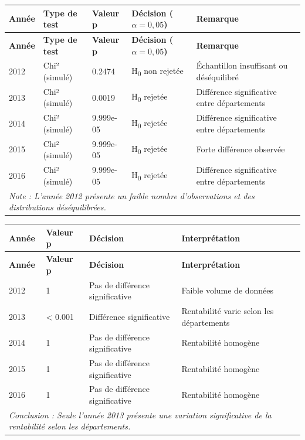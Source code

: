 \documentclass[mstat,12pt]{unswthesis}
\begin{document}
\scriptsize
\begin{longtable}{|p{1.2cm}|p{3.5cm}|p{2cm}|p{3cm}|p{4.2cm}|}
\hline
\textbf{Année} & \textbf{Type de test} & \textbf{Valeur p} & \textbf{Décision ($\alpha = 0{,}05$)} & \textbf{Remarque} \\
\hline \endfirsthead
\hline \textbf{Année} & \textbf{Type de test} & \textbf{Valeur p} & \textbf{Décision ($\alpha = 0{,}05$)} & \textbf{Remarque} \\ \hline \endhead
2012 & Chi² (simulé) & 0.2474 & H\textsubscript{0} non rejetée & Échantillon insuffisant ou déséquilibré \\
2013 & Chi² (simulé) & 0.0019 & H\textsubscript{0} rejetée & Différence significative entre départements \\
2014 & Chi² (simulé) & 9.999e-05 & H\textsubscript{0} rejetée & Différence significative entre départements \\
2015 & Chi² (simulé) & 9.999e-05 & H\textsubscript{0} rejetée & Forte différence observée \\
2016 & Chi² (simulé) & 9.999e-05 & H\textsubscript{0} rejetée & Différence significative entre départements \\
\hline
\multicolumn{5}{l}{\textit{Note : L’année 2012 présente un faible nombre d’observations et des distributions déséquilibrées.}}
\end{longtable}

\bigskip

\scriptsize
\begin{longtable}{|p{1.2cm}|p{3cm}|p{3.5cm}|p{6cm}|}
\hline
\textbf{Année} & \textbf{Valeur p} & \textbf{Décision} & \textbf{Interprétation} \\
\hline \endfirsthead
\hline \textbf{Année} & \textbf{Valeur p} & \textbf{Décision} & \textbf{Interprétation} \\ \hline \endhead
2012 & 1 & Pas de différence significative & Faible volume de données \\
2013 & \textless{} 0.001 & Différence significative & Rentabilité varie selon les départements \\
2014 & 1 & Pas de différence significative & Rentabilité homogène \\
2015 & 1 & Pas de différence significative & Rentabilité homogène \\
2016 & 1 & Pas de différence significative & Rentabilité homogène \\
\hline
\multicolumn{4}{l}{\textit{Conclusion : Seule l’année 2013 présente une variation significative de la rentabilité selon les départements.}}
\end{longtable}
\end{document}
